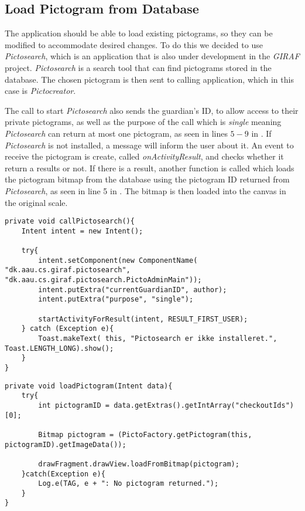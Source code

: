 \subsection{Load Pictogram from Database}
The application should be able to load existing pictograms, so they can be modified to accommodate desired changes.
To do this we decided to use \textit{Pictosearch}, which is an application that is also under development in the \textit{GIRAF} project.
\textit{Pictosearch} is a search tool that can find pictograms stored in the database.
The chosen pictogram is then sent to calling application, which in this case is \textit{Pictocreator}.

The call to start \textit{Pictosearch} also sends the guardian's ID, to allow access to their private pictograms, as well as the purpose of the call which is \textit{single} meaning \textit{Pictosearch} can return at most one pictogram, as seen in lines $5-9$ in .
If \textit{Pictosearch} is not installed, a message will inform the user about it.
An event to receive the pictogram is create, called \textit{onActivityResult}, and checks whether it return a results or not.
If there is a result, another function is called which loads the pictogram bitmap from the database using the pictogram ID returned from \textit{Pictosearch}, as seen in line 5 in  .
The bitmap is then loaded into the canvas in the original scale.

\begin{lstlisting}[caption=Method used to launch \textit{Pictosearch}., label=lst:callPictosearch]
private void callPictosearch(){
    Intent intent = new Intent();

    try{
        intent.setComponent(new ComponentName( "dk.aau.cs.giraf.pictosearch",  "dk.aau.cs.giraf.pictosearch.PictoAdminMain"));
        intent.putExtra("currentGuardianID", author);
        intent.putExtra("purpose", "single");

        startActivityForResult(intent, RESULT_FIRST_USER);
    } catch (Exception e){
        Toast.makeText( this, "Pictosearch er ikke installeret.", Toast.LENGTH_LONG).show();
    }
}
\end{lstlisting}

\begin{lstlisting}[caption=Method to load a pictogram from Id received from \textit{Pictosearch}, label=lst:loadPictogram]
private void loadPictogram(Intent data){
    try{
        int pictogramID = data.getExtras().getIntArray("checkoutIds")[0];

        Bitmap pictogram = (PictoFactory.getPictogram(this, pictogramID).getImageData());

        drawFragment.drawView.loadFromBitmap(pictogram);
    }catch(Exception e){
        Log.e(TAG, e + ": No pictogram returned.");
    }
}
\end{lstlisting}